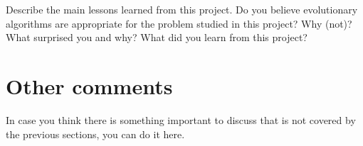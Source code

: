 \documentclass[a4paper,10pt]{article}
\newcommand{\ReplaceMe}[1]{{\color{blue}#1}}
\begin{document}
\ReplaceMe{Describe the main lessons learned from this project. Do you believe evolutionary algorithms are appropriate for the problem studied in this project? Why (not)? What surprised you and why? What did you learn from this project?}


\section{Other comments} \label{sec_other}

\ReplaceMe{In case you think there is something important to discuss that is not covered by the previous sections, you can do it here. }

 

\end{document}
